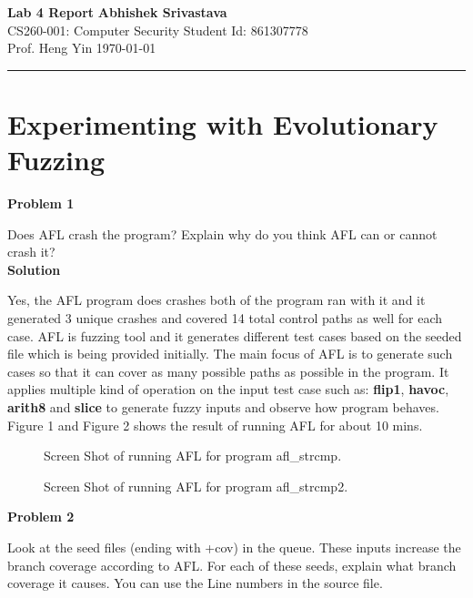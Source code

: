 \documentclass[a4paper, 12pt]{article}
\begin{document}
\noindent
\large\textbf{Lab 4 Report} \hfill \textbf{Abhishek Srivastava} \\
\normalsize CS260-001: Computer Security \hfill Student Id: 861307778 \\
\normalsize Prof. Heng Yin \hfill \today \\
\hrule

\section*{Experimenting with Evolutionary Fuzzing}

\textbf{Problem 1}

Does AFL crash the program? Explain why do you think AFL can or cannot crash it?\\

\noindent
\textbf{Solution}

Yes, the AFL program does crashes both of the program ran with it and it generated 3 unique crashes and covered 14 total control paths as well for each case. AFL is fuzzing tool and it generates different test cases based on the seeded file which is being provided initially. The main focus of AFL is to generate such cases so that it can cover as many possible paths as possible in the program. It applies multiple kind of operation on the input test case such as: \textbf{flip1}, \textbf{havoc}, \textbf{arith8} and \textbf{slice} to generate fuzzy inputs and observe how program behaves.\\


 
Figure 1 and Figure 2 shows the result of running AFL for about 10 mins.

\begin{figure}[!b]
	\centering
	\caption{Screen Shot of running AFL for program afl\_strcmp.}
\end{figure}

\begin{figure}
	\centering
	\caption{Screen Shot of running AFL for program afl\_strcmp2.}
\end{figure}

\newpage
\noindent
\textbf{Problem 2}

Look at the seed files (ending with +cov) in the queue. These inputs increase the branch coverage according to AFL. For each of these seeds, explain what branch coverage it causes. You can use the Line numbers in the source file.\\
\end{document}
